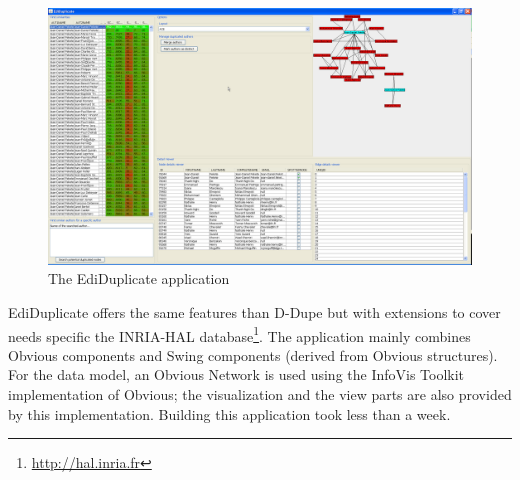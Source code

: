 \begin{figure}[!h]
\includegraphics[width=\columnwidth]{figures/ediduplicate}
\caption{The EdiDuplicate application}
\label{fig:ediduplicate}
\end{figure}

EdiDuplicate offers the same features than D-Dupe but with extensions
to cover needs specific the INRIA-HAL
database\footnote{\url{http://hal.inria.fr}}. The application mainly
combines Obvious components and Swing components (derived from Obvious
structures). For the data model, an Obvious Network is used using the
InfoVis Toolkit implementation of Obvious; the visualization and the
view parts are also provided by this implementation.  Building this
application took less than a week.

